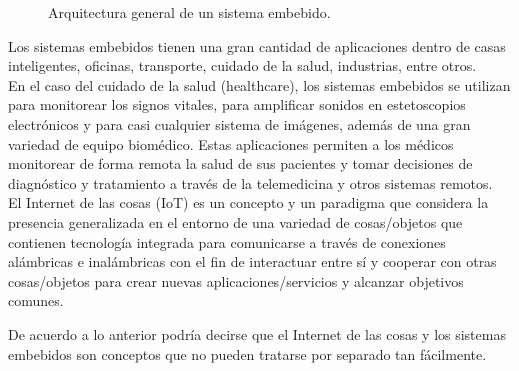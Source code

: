 \clearpage	
	\begin{figure}[htbp!]
		\centering
		\caption{Arquitectura general de un sistema embebido.}
		\label{fig:MarcoArquiSE}
	\end{figure}

	Los sistemas embebidos tienen una gran cantidad de aplicaciones dentro de casas inteligentes, oficinas, transporte, cuidado de la salud, industrias, entre otros. \\
	
	En el caso del cuidado de la salud (healthcare), los sistemas embebidos se utilizan para monitorear los signos vitales, para amplificar sonidos en estetoscopios electrónicos y para casi cualquier sistema de imágenes, además de una gran variedad de equipo biomédico. Estas aplicaciones permiten a los médicos monitorear de forma remota la salud de sus pacientes y tomar decisiones de diagnóstico y tratamiento a través de la telemedicina y otros sistemas remotos. \cite{delkinEmbSys} \\
	
	El Internet de las cosas (IoT) es un concepto y un paradigma que considera la presencia generalizada en el entorno de una variedad de cosas/objetos que contienen tecnología integrada para comunicarse a través de conexiones alámbricas e inalámbricas con el fin de interactuar entre sí y cooperar con otras cosas/objetos para crear nuevas aplicaciones/servicios y alcanzar objetivos comunes. \cite{vermesanIoT}
	
	De acuerdo a lo anterior podría decirse que el Internet de las cosas y los sistemas embebidos son conceptos que no pueden tratarse por separado tan fácilmente.

\pagebreak